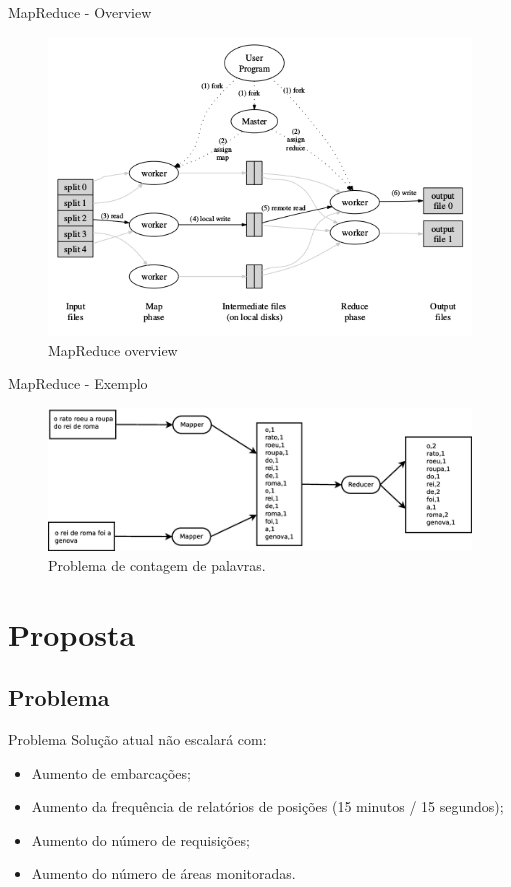 \documentclass{beamer}
\begin{document}
		\begin{frame}{MapReduce - Overview}
			\begin{figure}[H]
				\includegraphics[scale=0.5]{img/mapreduce_original_overview.png}
				\caption{MapReduce overview\cite{google_mapreduce}}
				\label{fig:mapreduce_example}
			\end{figure}
		\end{frame}

		\begin{frame}{MapReduce - Exemplo}
			\begin{figure}[H]
				\includegraphics[scale=0.26]{img/exemplo_mapreduce.eps}
				\caption{Problema de contagem de palavras.}
				\label{fig:mapreduce_example}
			\end{figure}
		\end{frame}

\section{Proposta}
	\subsection{Problema}
		\begin{frame}{Problema}
			Solução atual não escalará com:
			\begin{itemize}
				\item Aumento de embarcações;
				\item Aumento da frequência de relatórios de posições (15 minutos / 15 segundos);
				\item Aumento do número de requisições;
				\item Aumento do número de áreas monitoradas.
			\end{itemize}
		\end{frame}
\end{document}
